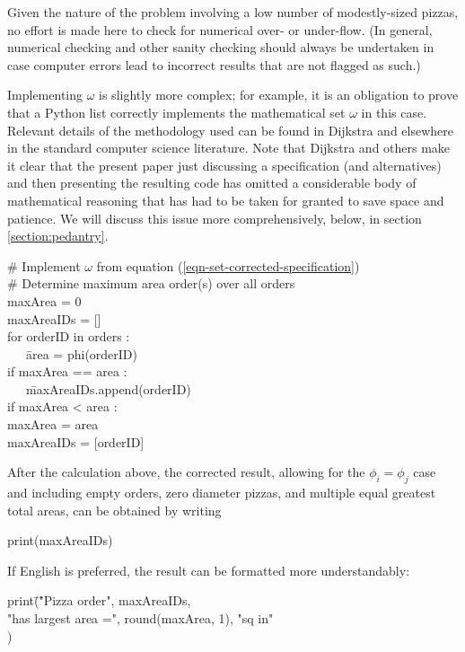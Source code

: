 \documentclass[11pt]{article}
\begin{document}
Given the nature of the problem involving a low number of modestly-sized pizzas, no effort is made here to check for numerical over- or under-flow. (In general, numerical checking and other sanity checking should always be undertaken in case computer errors lead to incorrect results that are not flagged as such.)

Implementing $\omega$ is slightly more complex; for example, it is an obligation to prove that a Python list correctly implements the mathematical set $\omega$ in this case. Relevant details of the methodology used can be found in Dijkstra \cite{dop} and elsewhere in the standard computer science literature. Note that Dijkstra and others make it clear that the present paper just discussing a specification (and alternatives) and then presenting the resulting code has omitted a considerable body of mathematical reasoning that has had to be taken for granted to save space and patience. We will discuss this issue more comprehensively, below, in section \ref{section:pedantry}.

{\tt\begin{tabbing}
\# Implement $\omega$ from equation (\ref{eqn-set-corrected-specification}) \\
\# Determine maximum area order(s) over all orders\\
maxArea = 0\\
maxAreaIDs = []\\
for orderID in orders :\\
\ \ \ \=area = phi(orderID)\\
   \>if maxArea == area : \\
   \>\ \ \ \=maxAreaIDs.append(orderID)\\
   \>if maxArea < area  :\\
   \>   \>maxArea = area\\
   \>   \>maxAreaIDs = [orderID]
\end{tabbing}}

After the calculation above, the corrected result, allowing for the $\phi_i=\phi_j$ case and including empty orders, zero diameter pizzas, and multiple equal greatest total areas, can be obtained by writing

{\tt\begin{tabbing}
print(maxAreaIDs)
\end{tabbing}}

If English is preferred, the result can be formatted more understandably:

{\tt\begin{tabbing}
   
print\=(\="Pizza order", maxAreaIDs, \\
     \> \>"has largest area =", round(maxArea, 1), "sq in"\\
     \>)
\end{tabbing}}
\end{document}
